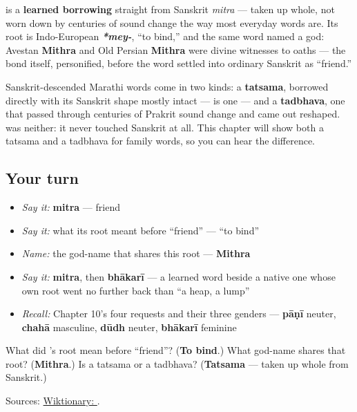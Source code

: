 \begin{cousinweb}
\textbf{} is a \textbf{learned borrowing} straight from Sanskrit \textbf{} \emph{mitra} — taken up whole, not worn down by centuries of sound change the way most everyday words are. Its root is Indo-European \emph{\textbf{*mey-}}, \textquotedblleft{}to bind,\textquotedblright{} and the same word named a god: Avestan \textbf{Mithra} and Old Persian \textbf{Mithra} were divine witnesses to oaths — the bond itself, personified, before the word settled into ordinary Sanskrit as \textquotedblleft{}friend.\textquotedblright{}
\end{cousinweb}

\begin{grammarlens}[title={Grammar Lens: taken up whole, not worn down}]
Sanskrit-descended Marathi words come in two kinds: a \textbf{tatsama}, borrowed directly with its Sanskrit shape mostly intact — \textbf{} is one — and a \textbf{tadbhava}, one that passed through centuries of Prakrit sound change and came out reshaped. \textbf{} was neither: it never touched Sanskrit at all. This chapter will show both a tatsama and a tadbhava for family words, so you can hear the difference.
\end{grammarlens}

\subsection*{Your turn}
\begin{itemize}
\raggedright
  \item \emph{Say it:} \textbf{mitra} — friend
  \item \emph{Say it:} what its root meant before \textquotedblleft{}friend\textquotedblright{} — \textquotedblleft{}to bind\textquotedblright{}
  \item \emph{Name:} the god-name that shares this root — \textbf{Mithra}
  \item \emph{Say it:} \textbf{mitra}, then \textbf{bhākarī} — a learned word beside a native one whose own root went no further back than \textquotedblleft{}a heap, a lump\textquotedblright{}
  \item \emph{Recall:} Chapter 10's four requests and their three genders — \textbf{pāṇī} neuter, \textbf{chahā} masculine, \textbf{dūdh} neuter, \textbf{bhākarī} feminine
\end{itemize}

\begin{tcolorbox}[breakable,colback=teal!4,colframe=teal!35!black,title={Before you move on}]
What did \textbf{}'s root mean before \textquotedblleft{}friend\textquotedblright{}? (\textbf{To bind}.) What god-name shares that root? (\textbf{Mithra}.) Is \textbf{} a tatsama or a tadbhava? (\textbf{Tatsama} — taken up whole from Sanskrit.)

Sources: \href{https://en.wiktionary.org/wiki/\%E0\%A4\%AE\%E0\%A4\%BF\%E0\%A4\%A4\%E0\%A5\%8D\%E0\%A4\%B0}{Wiktionary: }.
\end{tcolorbox}
